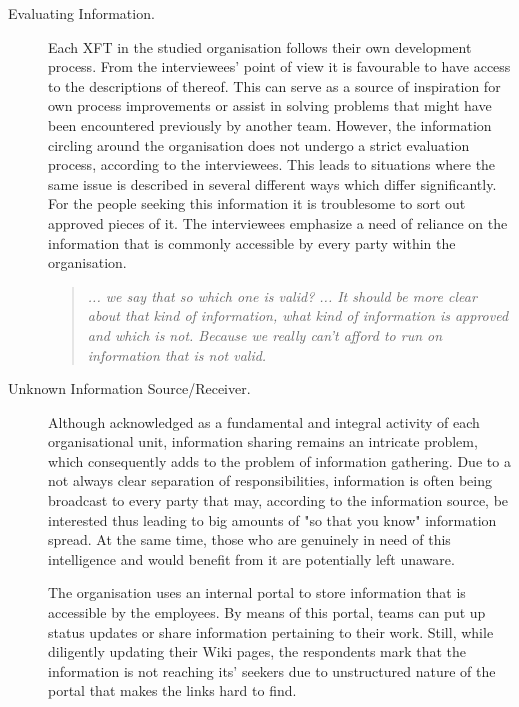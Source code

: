 \begin{description}

   \item[Evaluating Information.] Each XFT in the studied organisation follows their own development process. From the interviewees' point of view it is favourable to have access to the descriptions of thereof. This can serve as a source of inspiration for own process improvements or assist in solving problems that might have been encountered previously by another team. However, the information circling around the organisation does not undergo a strict evaluation process, according to the interviewees. This leads to situations where the same issue is described in several different ways which differ significantly. For the people seeking this information it is troublesome to sort out approved pieces of it. The interviewees emphasize a need of reliance on the information that is commonly accessible by every party within the organisation.
   
      \begin{quote}\itshape ... we say that  so which one is valid? ... It should be more clear about that kind of information, what kind of information is approved and which is not. Because we really can't afford to run on information that is not valid.
      \end{quote}

   \item[Unknown Information Source/Receiver.] Although acknowledged as a fundamental and integral activity of each organisational unit, information sharing remains an intricate problem, which consequently adds to the problem of information gathering. Due to a not always clear separation of responsibilities, information is often being broadcast to every party that may, according to the information source, be interested thus leading to big amounts of "so that you know" information spread. At the same time, those who are genuinely in need of this intelligence and would benefit from it are potentially left unaware.
      
   The organisation uses an internal portal to store information that is accessible by the employees. By means of this portal, teams can put up status updates or share information pertaining to their work. Still, while diligently updating their Wiki pages, the respondents mark that the information is not reaching its' seekers due to unstructured nature of the portal that makes the links hard to find.


\end{description}
